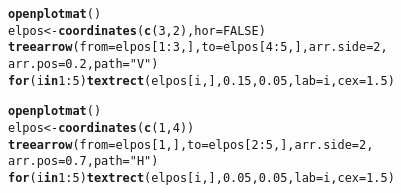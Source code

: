 \documentclass{article}\usepackage[]{graphicx}\usepackage[]{color}
\makeatletter
\newcommand{\hlnum}[1]{\textcolor[rgb]{0.686,0.059,0.569}{#1}}%
\newcommand{\hlstr}[1]{\textcolor[rgb]{0.192,0.494,0.8}{#1}}%
\newcommand{\hlopt}[1]{\textcolor[rgb]{0,0,0}{#1}}%
\newcommand{\hlstd}[1]{\textcolor[rgb]{0.345,0.345,0.345}{#1}}%
\newcommand{\hlkwa}[1]{\textcolor[rgb]{0.161,0.373,0.58}{\textbf{#1}}}%
\newcommand{\hlkwb}[1]{\textcolor[rgb]{0.69,0.353,0.396}{#1}}%
\newcommand{\hlkwc}[1]{\textcolor[rgb]{0.333,0.667,0.333}{#1}}%
\newcommand{\hlkwd}[1]{\textcolor[rgb]{0.737,0.353,0.396}{\textbf{#1}}}%
\newenvironment{kframe}{%
 \def\at@end@of@kframe{}%
 \ifinner\ifhmode%
  \def\at@end@of@kframe{\end{minipage}}%
  \begin{minipage}{\columnwidth}%
 \fi\fi%
 \def\FrameCommand##1{\hskip\@totalleftmargin \hskip-\fboxsep
 \colorbox{shadecolor}{##1}\hskip-\fboxsep
     \hskip-\linewidth \hskip-\@totalleftmargin \hskip\columnwidth}%
 \MakeFramed {\advance\hsize-\width
   \@totalleftmargin\z@ \linewidth\hsize
   \@setminipage}}%
 {\par\unskip\endMakeFramed%
 \at@end@of@kframe}
\newenvironment{knitrout}{}{} %
\makeatother
\begin{document}
\begin{knitrout}
\begin{kframe}
\begin{alltt}
\hlkwd{openplotmat}\hlstd{()}
\hlstd{elpos} \hlkwb{<-} \hlkwd{coordinates}\hlstd{(}\hlkwd{c}\hlstd{(}\hlnum{3}\hlstd{,} \hlnum{2}\hlstd{),} \hlkwc{hor} \hlstd{=} \hlnum{FALSE}\hlstd{)}
\hlkwd{treearrow}\hlstd{(}\hlkwc{from} \hlstd{= elpos[}\hlnum{1}\hlopt{:}\hlnum{3}\hlstd{, ],} \hlkwc{to} \hlstd{= elpos[}\hlnum{4}\hlopt{:}\hlnum{5}\hlstd{, ],} \hlkwc{arr.side} \hlstd{=} \hlnum{2}\hlstd{,}
    \hlkwc{arr.pos} \hlstd{=} \hlnum{0.2}\hlstd{,} \hlkwc{path} \hlstd{=} \hlstr{"V"}\hlstd{)}
\hlkwa{for} \hlstd{(i} \hlkwa{in} \hlnum{1}\hlopt{:}\hlnum{5}\hlstd{)} \hlkwd{textrect}\hlstd{(elpos[i, ],} \hlnum{0.15}\hlstd{,} \hlnum{0.05}\hlstd{,} \hlkwc{lab} \hlstd{= i,} \hlkwc{cex} \hlstd{=} \hlnum{1.5}\hlstd{)}

\hlkwd{openplotmat}\hlstd{()}
\hlstd{elpos} \hlkwb{<-} \hlkwd{coordinates}\hlstd{(}\hlkwd{c}\hlstd{(}\hlnum{1}\hlstd{,} \hlnum{4}\hlstd{))}
\hlkwd{treearrow}\hlstd{(}\hlkwc{from} \hlstd{= elpos[}\hlnum{1}\hlstd{, ],} \hlkwc{to} \hlstd{= elpos[}\hlnum{2}\hlopt{:}\hlnum{5}\hlstd{, ],} \hlkwc{arr.side} \hlstd{=} \hlnum{2}\hlstd{,}
    \hlkwc{arr.pos} \hlstd{=} \hlnum{0.7}\hlstd{,} \hlkwc{path} \hlstd{=} \hlstr{"H"}\hlstd{)}
\hlkwa{for} \hlstd{(i} \hlkwa{in} \hlnum{1}\hlopt{:}\hlnum{5}\hlstd{)} \hlkwd{textrect}\hlstd{(elpos[i, ],} \hlnum{0.05}\hlstd{,} \hlnum{0.05}\hlstd{,} \hlkwc{lab} \hlstd{= i,} \hlkwc{cex} \hlstd{=} \hlnum{1.5}\hlstd{)}


\end{alltt}
\end{kframe}
\end{knitrout}
\end{document}
